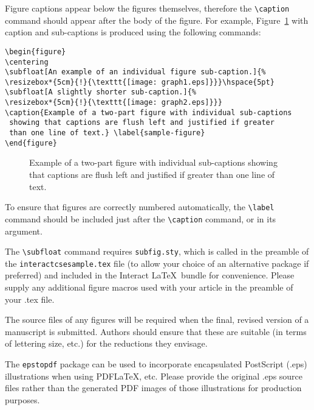 \documentclass[]{interact}
\theoremstyle{plain}%
\theoremstyle{definition}
\theoremstyle{remark}
\begin{document}
Figure captions appear below the figures themselves, therefore the \verb"\caption" command should appear after the body of the figure. For example, Figure~\ref{sample-figure} with caption and sub-captions is produced using the following commands:
\begin{verbatim}
\begin{figure}
\centering
\subfloat[An example of an individual figure sub-caption.]{%
\resizebox*{5cm}{!}{\texttt{[image: graph1.eps]}}}\hspace{5pt}
\subfloat[A slightly shorter sub-caption.]{%
\resizebox*{5cm}{!}{\texttt{[image: graph2.eps]}}}
\caption{Example of a two-part figure with individual sub-captions
 showing that captions are flush left and justified if greater
 than one line of text.} \label{sample-figure}
\end{figure}
\end{verbatim}
\begin{figure}
\centering
{}\hspace{5pt}
\caption{Example of a two-part figure with individual sub-captions
 showing that captions are flush left and justified if greater
 than one line of text.} \label{sample-figure}
\end{figure}

To ensure that figures are correctly numbered automatically, the \verb"\label" command should be included just after the \verb"\caption" command, or in its argument.

The \verb"\subfloat" command requires \verb"subfig.sty", which is called in the preamble of the \texttt{interactcsesample.tex} file (to allow your choice of an alternative package if preferred) and included in the \textsf{Interact} \LaTeX\ bundle for convenience. Please supply any additional figure macros used with your article in the preamble of your .tex file.

The source files of any figures will be required when the final, revised version of a manuscript is submitted. Authors should ensure that these are suitable (in terms of lettering size, etc.) for the reductions they envisage.

The \texttt{epstopdf} package can be used to incorporate encapsulated PostScript (.eps) illustrations when using PDF\LaTeX, etc. Please provide the original .eps source files rather than the generated PDF images of those illustrations for production purposes.
\end{document}
